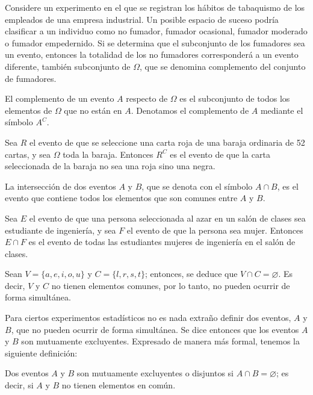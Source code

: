 Considere un experimento en el que se registran los hábitos de tabaquismo de los empleados de una empresa industrial. Un posible espacio de suceso podría clasificar a un individuo como no fumador, fumador ocasional, fumador moderado o fumador empedernido. Si se determina que el subconjunto de los fumadores sea un evento, entonces la totalidad de los no fumadores corresponderá a un evento diferente, también subconjunto de $\Omega$, que se denomina complemento del conjunto de fumadores.

\begin{definicion}{}{}
    El complemento de un evento $A$ respecto de $\Omega$ es el subconjunto de todos los elementos de $\Omega$ que no están en $A$. Denotamos el complemento de $A$ mediante el símbolo $A^C$.
\end{definicion}

\begin{examplebox}{}{}
    Sea $R$ el evento de que se seleccione una carta roja de una baraja ordinaria de 52 cartas, y sea $\Omega$ toda la baraja. Entonces $R^C$ es el evento de que la carta seleccionada de la baraja no sea una roja sino una negra.
\end{examplebox}

\begin{definicion}{}{}
    La intersección de dos eventos $A$ y $B$, que se denota con el símbolo $A \cap B$, es el evento que contiene todos los elementos que son comunes entre $A$ y $B$.
\end{definicion}

\begin{examplebox}{}{}
    Sea $E$ el evento de que una persona seleccionada al azar en un salón de clases sea estudiante de ingeniería, y sea $F$ el evento de que la persona sea mujer. Entonces $E \cap F$ es el evento de todas las estudiantes mujeres de ingeniería en el salón de clases.
\end{examplebox}

\newpage

\begin{examplebox}{}{}
    Sean $V = \{ a, e, i, o, u \}$ y $C = \{l, r, s, t \}$; entonces, se deduce que $V \cap C = \varnothing$. Es decir, $V$ y $C$ no tienen elementos comunes, por lo tanto, no pueden ocurrir de forma simultánea.
\end{examplebox}

Para ciertos experimentos estadísticos no es nada extraño definir dos eventos, $A$ y $B$, que no pueden ocurrir de forma simultánea. Se dice entonces que los eventos $A$ y $B$ son mutuamente excluyentes. Expresado de manera más formal, tenemos la siguiente definición:
\begin{definicion}{}{}
    Dos eventos $A$ y $B$ son mutuamente excluyentes o disjuntos si $A \cap B = \varnothing$; es decir, si $A$ y $B$ no tienen elementos en común.
\end{definicion}

